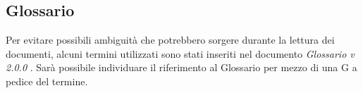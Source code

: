 \subsection{Glossario}
Per evitare possibili ambiguità che potrebbero sorgere durante la lettura dei documenti,
alcuni termini utilizzati sono stati inseriti nel documento \textit{Glossario v 2.0.0 }.
Sarà possibile individuare il riferimento al Glossario per mezzo
di una G a pedice del termine.
